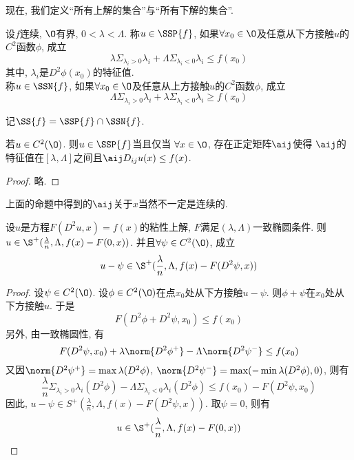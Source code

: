 现在, 我们定义“所有上解的集合”与“所有下解的集合”.  
\begin{definition}
    设$f$连续, $\O$有界, $0< \lambda < \Lambda$.  称$u \in \SSP{f}$, 如果$\forall  x_0 \in \O$及任意从下方接触$u$的$C^2$函数$\phi$, 成立
    \begin{equation}
        \lambda \Sigma_{\lambda_i >0} \lambda_i + \Lambda \Sigma_{\lambda_i <0} \lambda_i \le f(x_0)
    \end{equation}
    其中, $\lambda_i$是$D^2\phi(x_0)$的特征值.  \\
    称$u \in \SSN{f}$, 如果$\forall  x_0 \in \O$及任意从上方接触$u$的$C^2$函数$\phi$, 成立
    \begin{equation}
        \Lambda \Sigma_{\lambda_i >0} \lambda_i + \lambda \Sigma_{\lambda_i <0} \lambda_i \ge f(x_0)
    \end{equation}
\end{definition}
记$\SS{f}=\SSP{f} \cap \SSN{f}$.  
\begin{proposition}
    若$u \in C^2(\O)$.  则$u \in \SSP{f}$当且仅当 $\forall x \in \O$, 存在正定矩阵$\aij$使得 $\aij$的特征值在$[\lambda, \Lambda]$之间且$\aij D_{ij}u(x) \le f(x)$.  
\end{proposition}
\begin{proof}
    略.  
\end{proof}
\begin{remark}
    上面的命题中得到的$\aij$关于$x$当然不一定是连续的.  
\end{remark}
\begin{proposition} \label{ppp1}
    设$u$是方程$F(D^2u, x) = f(x)$的粘性上解, $F$满足$(\lambda, \Lambda)$一致椭圆条件.  则$u \in \S^+(\frac{\lambda}{n}, \Lambda, f(x)-F(0, x))$.  并且$\forall \psi \in C^2(\O)$, 成立 
    \begin{equation}
        u-\psi \in \S^+(\frac{\lambda}{n}, \Lambda, f(x)-F(D^2\psi, x))
    \end{equation}
\end{proposition}
\begin{proof}
    设$\psi \in C^2(\O)$.  设$\phi \in C^2(\O)$在点$x_0$处从下方接触$u-\psi$.  则$\phi+\psi$在$x_0$处从下方接触$u$.  于是
    \begin{equation}
        F(D^2\phi+D^2\psi, x_0) \le f(x_0)
    \end{equation}
    另外, 由一致椭圆性, 有
    \begin{equation}
        F(D^2\psi, x_0) + \lambda\norm{D^2\phi^+}-\Lambda\norm{D^2\psi^-} \le f(x_0)
    \end{equation}
    又因$\norm{D^2\psi^+}=\max\lambda(D^2\phi)$, $\norm{D^2\psi^-}=\max(-\min\lambda(D^2\phi), 0)$, 则有
    \begin{equation}
        \frac{\lambda}{n}\Sigma_{\lambda_i>0}\lambda_i(D^2\phi)-\Lambda\Sigma_{\lambda_i<0}\lambda_i(D^2\phi) \le f(x_0) - F(D^2\psi, x_0)
    \end{equation}
    因此, $u-\psi \in S^+(\frac{\lambda}{n}, \Lambda, f(x)-F(D^2\psi, x))$.  取$\psi=0$, 则有 
    \begin{equation}
        u\in \S^+(\frac{\lambda}{n}, \Lambda, f(x)-F(0, x))
    \end{equation}
\end{proof}
